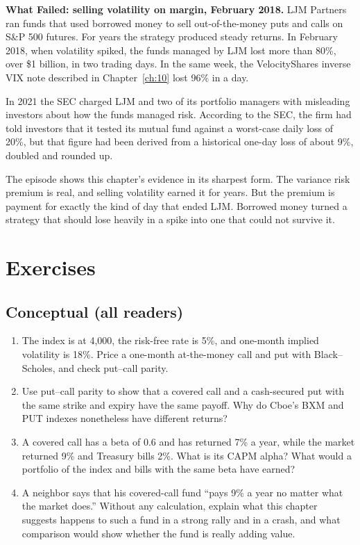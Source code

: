\begin{callout}
\textbf{What Failed: selling volatility on margin, February 2018.} LJM Partners ran funds that used borrowed money to sell out-of-the-money puts and calls on S\&P 500 futures. For years the strategy produced steady returns. In February 2018, when volatility spiked, the funds managed by LJM lost more than 80\%, over \$1 billion, in two trading days. In the same week, the VelocityShares inverse VIX note described in Chapter~\ref{ch:10} lost 96\% in a day.

In 2021 the SEC charged LJM and two of its portfolio managers with misleading investors about how the funds managed risk. According to the SEC, the firm had told investors that it tested its mutual fund against a worst-case daily loss of 20\%, but that figure had been derived from a historical one-day loss of about 9\%, doubled and rounded up.

The episode shows this chapter's evidence in its sharpest form. The variance risk premium is real, and selling volatility earned it for years. But the premium is payment for exactly the kind of day that ended LJM. Borrowed money turned a strategy that should lose heavily in a spike into one that could not survive it.
\end{callout}

\section*{Exercises}

\subsection*{Conceptual (all readers)}

\begin{enumerate}
  \item The index is at 4,000, the risk-free rate is 5\%, and one-month implied volatility is 18\%. Price a one-month at-the-money call and put with Black--Scholes, and check put--call parity.
  \item Use put--call parity to show that a covered call and a cash-secured put with the same strike and expiry have the same payoff. Why do Cboe's BXM and PUT indexes nonetheless have different returns?
  \item A covered call has a beta of 0.6 and has returned 7\% a year, while the market returned 9\% and Treasury bills 2\%. What is its CAPM alpha? What would a portfolio of the index and bills with the same beta have earned?
  \item A neighbor says that his covered-call fund ``pays 9\% a year no matter what the market does.'' Without any calculation, explain what this chapter suggests happens to such a fund in a strong rally and in a crash, and what comparison would show whether the fund is really adding value.
\end{enumerate}


